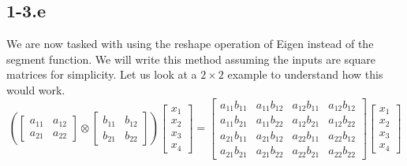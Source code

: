 \documentclass{article}
\begin{document}
\subsection*{1-3.e}
We are now tasked with using the reshape operation of Eigen instead of the segment function. We will write this method assuming the inputs are square matrices for simplicity. Let us look at a $2\times 2$ example to understand how this would work.
\begin{equation*}
    \left(\begin{bmatrix}
        a_{11} & a_{12} \\
        a_{21} & a_{22}
    \end{bmatrix}
    \otimes
    \begin{bmatrix}
        b_{11} & b_{12} \\
        b_{21} & b_{22}
    \end{bmatrix}\right)
    \begin{bmatrix}
        x_{1} \\x_{2} \\x_{3} \\x_{4}
    \end{bmatrix} = \begin{bmatrix}
    a_{11}b_{11} & a_{11}b_{12} & a_{12}b_{11} & a_{12}b_{12} \\
    a_{11}b_{21} & a_{11}b_{22} & a_{12}b_{21} & a_{12}b_{22} \\
    a_{21}b_{11} & a_{21}b_{12} & a_{22}b_{11} & a_{22}b_{12} \\
    a_{21}b_{21} & a_{21}b_{22} & a_{22}b_{21} & a_{22}b_{22} 
\end{bmatrix}\begin{bmatrix}
        x_{1} \\x_{2} \\x_{3} \\x_{4}
    \end{bmatrix}
\end{equation*} 

\pagebreak
\end{document}
